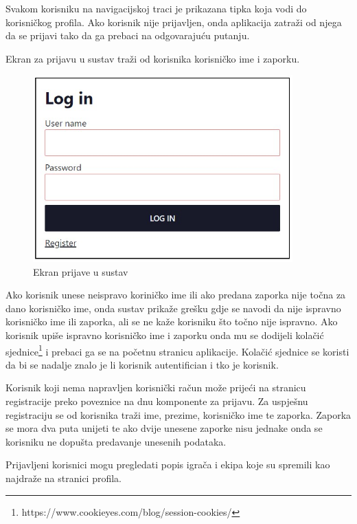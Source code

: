 \documentclass[times, utf8, zavrsni]{fer}
\begin{document}
Svakom korisniku na navigacijskoj traci je prikazana tipka koja vodi do korisničkog profila. Ako korisnik nije prijavljen, onda aplikacija zatraži od njega da se prijavi tako da ga prebaci na odgovarajuću putanju.

Ekran za prijavu u sustav traži od korisnika korisničko ime i zaporku.

\begin{figure}[htb]
\centering
\includegraphics[width=10cm]{images/login.jpg}
\caption{Ekran prijave u sustav}
\label{fig:login}
\end{figure}

Ako korisnik unese neispravo koriničko ime ili ako predana zaporka nije točna za dano korisničko ime, onda sustav prikaže grešku gdje se navodi da nije ispravno korisničko ime ili zaporka, ali se ne kaže korisniku što točno nije ispravno.
Ako korisnik upiše ispravno korisničko ime i zaporku onda mu se dodijeli kolačić sjednice\footnote{https://www.cookieyes.com/blog/session-cookies/} i prebaci ga se na početnu stranicu aplikacije.
Kolačić sjednice se koristi da bi se nadalje znalo je li korisnik autentifician i tko je korisnik.

Korisnik koji nema napravljen korisnički račun može prijeći na stranicu registracije preko poveznice na dnu komponente za prijavu.
Za uspješnu registraciju se od korisnika traži ime, prezime, korisničko ime te zaporka. Zaporka se mora dva puta unijeti te ako dvije unesene zaporke nisu jednake onda se korisniku ne dopušta predavanje unesenih podataka.

Prijavljeni korisnici mogu pregledati popis igrača i ekipa koje su spremili kao najdraže na stranici profila.
\end{document}
